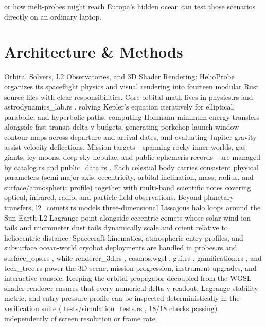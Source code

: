 \documentclass[10pt,letterpaper]{article}
\begin{document}
or how melt-probes might reach Europa's hidden ocean can test those scenarios directly on an ordinary laptop.

\section{Architecture \& Methods}
Orbital Solvers, L2 Observatories, and 3D Shader Rendering: HelioProbe organizes its spaceflight physics and visual rendering into fourteen modular Rust source files with clear responsibilities. Core orbital math lives in physics.rs and astrodynamics\_lab.rs , solving Kepler's equation iteratively for elliptical, parabolic, and hyperbolic paths, computing Hohmann minimum-energy transfers alongside fast-transit delta-v budgets, generating porkchop launch-window contour maps across departure and arrival dates, and evaluating Jupiter gravity-assist velocity deflections. Mission targets---spanning rocky inner worlds, gas giants, icy moons, deep-sky nebulae, and public ephemeris records---are managed by catalog.rs and public\_data.rs . Each celestial body carries consistent physical parameters (semi-major axis, eccentricity, orbital inclination, mass, radius, and surface/atmospheric profile) together with multi-band scientific notes covering optical, infrared, radio, and particle-field observations. Beyond planetary transfers, l2\_comets.rs models three-dimensional Lissajous halo loops around the Sun-Earth L2 Lagrange point alongside eccentric comets whose solar-wind ion tails and micrometer dust tails dynamically scale and orient relative to heliocentric distance. Spacecraft kinematics, atmospheric entry profiles, and subsurface ocean-world cryobot deployments are handled in probes.rs and surface\_ops.rs , while renderer\_3d.rs , cosmos.wgsl , gui.rs , gamification.rs , and tech\_tree.rs power the 3D scene, mission progression, instrument upgrades, and interactive console. Keeping the orbital propagator decoupled from the WGSL shader renderer ensures that every numerical delta-v readout, Lagrange stability metric, and entry pressure profile can be inspected deterministically in the verification suite ( tests/simulation\_tests.rs , 18/18 checks passing) independently of screen resolution or frame rate.
\end{document}

